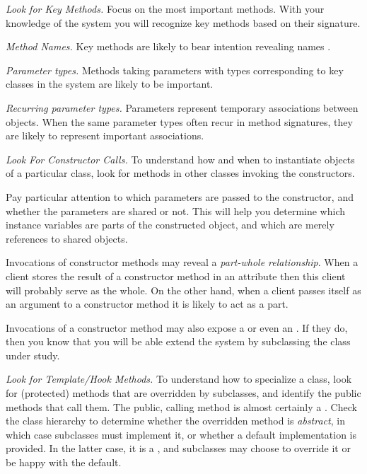 \documentclass[a4paper,10pt,twoside]{book}
\begin{document}
\noindent
\emph{Look for Key Methods.}
Focus on the most important methods. With your knowledge of the system you will recognize key methods based on their signature.

\begin{bulletlist}
\item \emph{Method Names.}
Key methods are likely to bear intention revealing names \cite{Beck97a}.

\item \emph{Parameter types.}
Methods taking parameters with types corresponding to key classes in the system are likely to be important.

\item \emph{Recurring parameter types.}
Parameters represent temporary associations between objects. When the same parameter types often recur in method signatures, they are likely to represent important associations.
\end{bulletlist}

\noindent
\emph{Look For Constructor Calls.}
To understand how and when to instantiate objects of a particular class, look for methods in other classes invoking the constructors.

Pay particular attention to which parameters are passed to the constructor, and whether the parameters are shared or not. This will help you determine which instance variables are parts of the constructed object, and which are merely references to shared objects.

Invocations of constructor methods may reveal a \emph{part-whole relationship}. When a client stores the result of a constructor method in an attribute then this client will probably serve as the whole. On the other hand, when a client passes itself as an argument to a constructor method it is likely to act as a part.

Invocations of a constructor method may also expose a  or even an . If they do, then you know that you will be able extend the system by subclassing the class under study.

\noindent
\emph{Look for Template/Hook Methods.}
To understand how to specialize a class, look for (protected) methods that are overridden by subclasses, and identify the public methods that call them. The public, calling method is almost certainly a . Check the class hierarchy to determine whether the overridden method is \emph{abstract}, in which case subclasses must implement it, or whether a default implementation is provided. In the latter case, it is a , and subclasses may choose to override it or be happy with the default.
\end{document}

